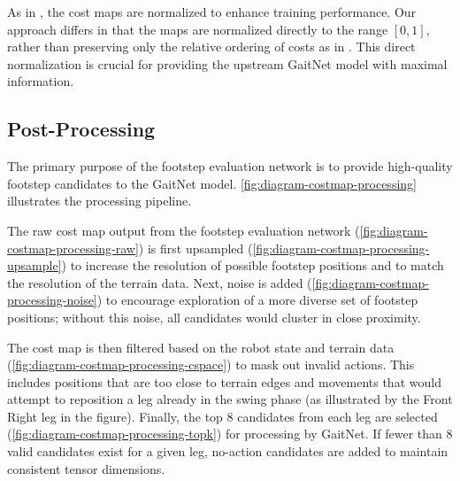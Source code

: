 As in \cite{bratta_contactnet_2024}, the cost maps are normalized to
enhance training performance. Our approach differs in that the maps
are normalized directly to the range $[0, 1]$, rather than preserving
only the relative ordering of costs as in
\cite{bratta_contactnet_2024}. This direct normalization is crucial
for providing the upstream GaitNet model with maximal information.

\subsection{Post-Processing}

The primary purpose of the footstep evaluation network is to provide
high-quality footstep candidates to the GaitNet model.
\autoref{fig:diagram-costmap-processing} illustrates the processing pipeline.

The raw cost map output from the footstep evaluation network
(\autoref{fig:diagram-costmap-processing-raw}) is first upsampled
(\autoref{fig:diagram-costmap-processing-upsample}) to increase the
resolution of possible footstep positions and to match the resolution
of the terrain data. Next, noise is added
(\autoref{fig:diagram-costmap-processing-noise}) to encourage
exploration of a more diverse set of footstep positions; without this
noise, all candidates would cluster in close proximity.

The cost map is then filtered based on the robot state and terrain
data (\autoref{fig:diagram-costmap-processing-cspace}) to mask out
invalid actions. This includes positions that are too close to
terrain edges and movements that would attempt to reposition a leg
already in the swing phase (as illustrated by the Front Right leg in
the figure). Finally, the top 8 candidates from each leg are selected
(\autoref{fig:diagram-costmap-processing-topk}) for processing by
GaitNet. If fewer than 8 valid candidates exist for a given leg,
no-action candidates are added to maintain consistent tensor dimensions.

\def\imgwidth{0.16\textwidth}
\def\xgap{2em}          %
\def\arrowwidth{1.2em}  %
\def\arrowshift{0.5em} %

